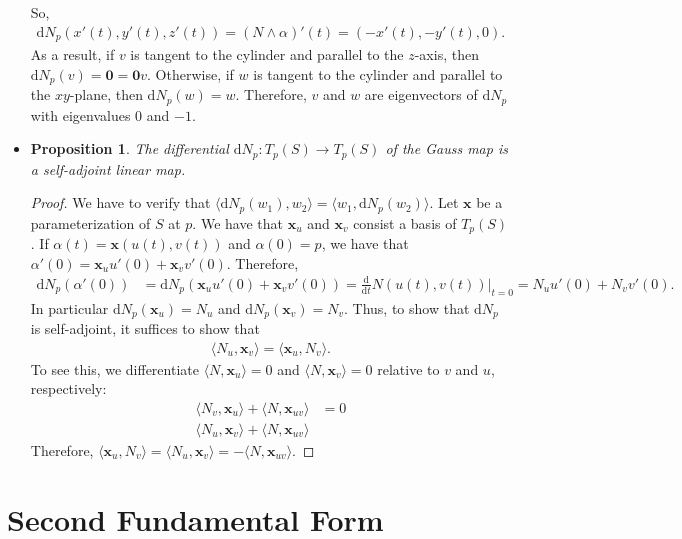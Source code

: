 \documentclass[10pt]{article}
\newtheorem{proposition}[lemma]{Proposition}
\newcommand{\dee}{\mathrm{d}}
\newcommand{\ve}[1]{\mathbf{#1}}
\newcommand{\ra}{\rightarrow}
\begin{document}
\begin{itemize}
    So,
    \begin{align*}
      \dee N_p(x'(t), y'(t), z'(t)) = (N \wedge \alpha)'(t) = (-x'(t), -y'(t), 0).
    \end{align*}
    As a result, if $v$ is tangent to the cylinder and parallel to the $z$-axis, then $\dee N_p(v) = \ve{0} = \ve{0}v$. Otherwise, if $w$ is tangent to the cylinder and parallel to the $xy$-plane, then $\dee N_p(w) = w$. Therefore, $v$ and $w$ are eigenvectors of $\dee N_p$ with eigenvalues $0$ and $-1$.

    \item \begin{proposition}
      The differential $\dee N_p : T_p(S) \ra T_p(S)$ of the Gauss map is a self-adjoint linear map.
    \end{proposition}
    \begin{proof}
      We have to verify that $\langle \dee N_p(w_1), w_2 \rangle = \langle w_1, \dee N_p(w_2) \rangle$. Let $\ve{x}$ be a parameterization of $S$ at $p$. We have that $\ve{x}_u$ and $\ve{x}_v$ consist a basis of $T_p(S)$. If $\alpha(t) = \ve{x}(u(t), v(t))$ and $\alpha(0) = p$, we have that $\alpha'(0) = \ve{x}_u u'(0) + \ve{x}_v v'(0)$. Therefore,
      \begin{align*}
        \dee N_p(\alpha'(0)) &= \dee N_p(\ve{x}_u u'(0) + \ve{x}_v v'(0)) = \frac{\dee}{\dee t}N(u(t),v(t)) \bigg|_{t=0} = N_u u'(0) + N_v v'(0).
      \end{align*}
      In particular $\dee N_p(\ve{x}_u) = N_u$ and $\dee N_p(\ve{x}_v) = N_v$. Thus, to show that $\dee N_p$ is self-adjoint, it suffices to show that
      \begin{align*}
        \langle N_u, \ve{x}_v \rangle = \langle \ve{x}_u, N_v \rangle.
      \end{align*}
      To see this, we differentiate $\langle N, \ve{x}_u \rangle = 0$ and $\langle N, \ve{x}_v \rangle = 0$ relative to $v$ and $u$, respectively:
      \begin{align*}
        \langle N_v, \ve{x}_u \rangle + \langle N, \ve{x}_{uv} \rangle &= 0\\
        \langle N_u, \ve{x}_v \rangle + \langle N, \ve{x}_{uv} \rangle
      \end{align*}
      Therefore, $\langle \ve{x}_u, N_v \rangle = \langle N_u, \ve{x}_v \rangle = -\langle N, \ve{x}_{uv} \rangle$.
    \end{proof}
  \end{itemize}

  \section{Second Fundamental Form}
\end{document}
